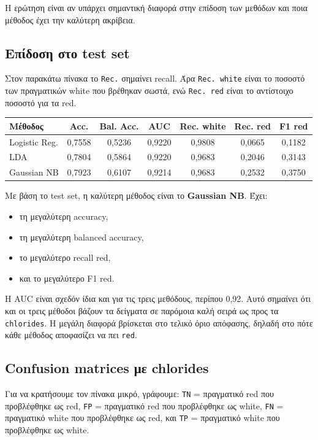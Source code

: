 \documentclass[11pt,a4paper]{article}
\newcommand{\code}[1]{\texttt{#1}}
\begin{document}
Η ερώτηση είναι αν υπάρχει σημαντική διαφορά στην επίδοση των μεθόδων και
ποια μέθοδος έχει την καλύτερη ακρίβεια.

\subsection{Επίδοση στο test set}

Στον παρακάτω πίνακα το \code{Rec.} σημαίνει recall. Άρα \code{Rec. white}
είναι το ποσοστό των πραγματικών white που βρέθηκαν σωστά, ενώ
\code{Rec. red} είναι το αντίστοιχο ποσοστό για τα red.

\begin{center}
{\small
\begin{tabular}{lcccccc}
\toprule
Μέθοδος & Acc. & Bal. Acc. & AUC & Rec. white & Rec. red & F1 red \\
\midrule
Logistic Reg. & 0,7558 & 0,5236 & 0,9220 & 0,9808 & 0,0665 & 0,1182 \\
LDA & 0,7804 & 0,5864 & 0,9220 & 0,9683 & 0,2046 & 0,3143 \\
Gaussian NB & 0,7923 & 0,6107 & 0,9214 & 0,9683 & 0,2532 & 0,3750 \\
\bottomrule
\end{tabular}
}
\end{center}

Με βάση το test set, η καλύτερη μέθοδος είναι το \textbf{Gaussian NB}. Έχει:
\begin{itemize}
    \item τη μεγαλύτερη accuracy,
    \item τη μεγαλύτερη balanced accuracy,
    \item το μεγαλύτερο recall red,
    \item και το μεγαλύτερο F1 red.
\end{itemize}

Η AUC είναι σχεδόν ίδια και για τις τρεις μεθόδους, περίπου 0,92. Αυτό
σημαίνει ότι και οι τρεις μέθοδοι βάζουν τα δείγματα σε παρόμοια καλή σειρά
ως προς τα \code{chlorides}. Η μεγάλη διαφορά βρίσκεται στο τελικό όριο
απόφασης, δηλαδή στο πότε κάθε μέθοδος αποφασίζει να πει \code{red}.

\subsection{Confusion matrices με chlorides}

Για να κρατήσουμε τον πίνακα μικρό, γράφουμε:
\code{TN} = πραγματικό red που προβλέφθηκε ως red,
\code{FP} = πραγματικό red που προβλέφθηκε ως white,
\code{FN} = πραγματικό white που προβλέφθηκε ως red,
και \code{TP} = πραγματικό white που προβλέφθηκε ως white.
\end{document}
